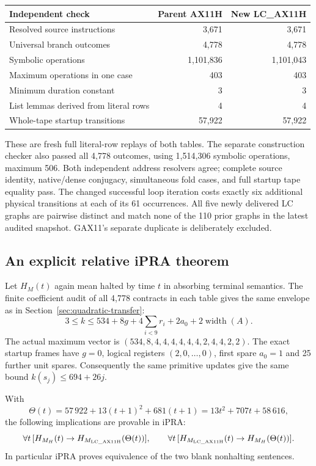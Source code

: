 \begin{center}
\begin{tabular}{@{}lrr@{}}
\toprule
Independent check & Parent AX11H & New LC\_AX11H\\
\midrule
Resolved source instructions & 3,671 & 3,671\\
Universal branch outcomes & 4,778 & 4,778\\
Symbolic operations & 1,101,836 & 1,101,043\\
Maximum operations in one case & 403 & 403\\
Minimum duration constant & 3 & 3\\
List lemmas derived from literal rows & 4 & 4\\
Whole-tape startup transitions & 57,922 & 57,922\\
\bottomrule
\end{tabular}
\end{center}

These are fresh full literal-row replays of both tables. The separate
construction checker also passed all 4,778 outcomes, using 1,514,306
symbolic operations, maximum 506. Both independent address resolvers
agree; complete source identity, native/dense conjugacy, simultaneous
fold cases, and full startup tape equality pass. The changed successful
loop iteration costs exactly six additional physical transitions at each
of its 61 occurrences. All five newly delivered LC graphs are pairwise
distinct and match none of the 110 prior graphs in the latest audited
snapshot. GAX11's separate duplicate is deliberately excluded.

\subsection{An explicit relative iPRA theorem}

Let $H_M(t)$ again mean halted by time $t$ in absorbing terminal semantics.
The finite coefficient audit of all 4,778 contracts in each table gives
the same envelope as in Section~\ref{sec:quadratic-transfer}:
\[
 3\le k\le534+8g+4\sum_{i<9}r_i+2a_0+2\operatorname{width}(A).
\]
The actual maximum vector is
$(534,8,4,4,4,4,4,4,2,4,4,2,2)$.
The exact startup frames have $g=0$, logical registers $(2,0,\ldots,0)$,
first spare $a_0=1$ and 25 further unit spares. Consequently the same
primitive updates give the same bound $k(s_j)\le694+26j$.

\begin{theorem}
With
\[
 \boxed{\Theta(t)=57\,922+13(t+1)^2+681(t+1)
                    =13t^2+707t+58\,616,}
\]
the following implications are provable in iPRA:
\[
 \forall t\,[H_{M_H}(t)\to H_{M_{\mathrm{LC\_AX11H}}}(\Theta(t))],\qquad
 \forall t\,[H_{M_{\mathrm{LC\_AX11H}}}(t)\to H_{M_H}(\Theta(t))].
\]
In particular iPRA proves equivalence of the two blank nonhalting
sentences.
\end{theorem}

